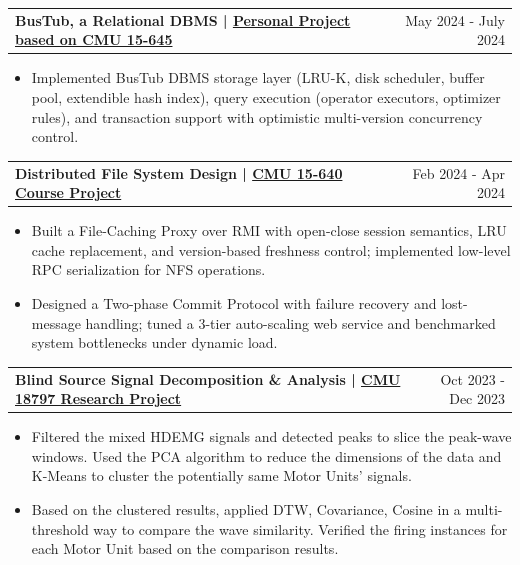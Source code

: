 \documentclass[a4paper,20pt]{article}
\makeatletter
\newcommand{\resumeProjectsSubHeading}[2]{
  \resumeProjectsSubHeadingItem{#1}{#2}
  \vspace{-10pt}
}
\newcommand{\resumeProjectsSubHeadingItem}[2]{
  \vspace{-1pt}
  \item{
    \begin{tabular*} {0.98\textwidth} {@{\hspace{-0.5em}}l@{\extracolsep{\fill}}r}
      \textbf{#1} & {#2} \\
    \end{tabular*}
  \vspace{-8pt}
  }
}
\newcommand{\resumeProjectsItemListStart}{
  \begin{itemize} [leftmargin=*]
}
\newcommand{\resumeProjectsItemListEnd}{
  \end{itemize}
  \vspace{0pt}
}
\newcommand{\resumeProjectsItem}[1]{
  \item{
    {#1} \vspace{-2pt}
  }
}
\makeatother
\begin{document}
\resumeProjectsSubHeading{{BusTub, a Relational DBMS} {| \href{https://github.com/Guo-lab/15645-Database}{Personal Project based on CMU 15-645 \faIcon{github}}}}{May 2024 - July 2024}
\resumeProjectsItemListStart
\resumeProjectsItem{Implemented BusTub DBMS storage layer (LRU-K, disk scheduler, buffer   
    pool, extendible hash index), query execution (operator executors,     
    optimizer rules), and transaction support with optimistic multi-version
     concurrency control. }
\resumeProjectsItemListEnd

\vspace{-3pt}

\resumeProjectsSubHeading{{Distributed File System Design} {| \href{https://github.com/Guo-lab/15640-Distributed-Systems}{CMU 15-640 Course Project \faIcon{github}}}}{Feb 2024 - Apr 2024}
\resumeProjectsItemListStart
\resumeProjectsItem{Built a File-Caching Proxy over RMI with open-close session semantics, LRU cache replacement, and version-based freshness control; implemented low-level RPC serialization for NFS operations.}
\resumeProjectsItem{Designed a Two-phase Commit Protocol with failure recovery and lost-message handling; tuned a 3-tier auto-scaling web service and benchmarked system bottlenecks under dynamic load.}
\resumeProjectsItemListEnd

\resumeProjectsSubHeading{Blind Source Signal Decomposition \& Analysis | \href{https://github.com/Guo-lab/MLSP-G2}{CMU 18797 Research Project \faIcon{github}}}{Oct 2023 - Dec 2023}
\resumeProjectsItemListStart
\resumeProjectsItem{Filtered the mixed HDEMG signals and detected peaks to slice the peak-wave windows. Used the PCA algorithm to reduce the dimensions of the data and K-Means to cluster the potentially same Motor Units' signals.}
\resumeProjectsItem{Based on the clustered results, applied DTW, Covariance, Cosine in a multi-threshold way to compare the wave similarity. Verified the firing instances for each Motor Unit based on the comparison results.}
\resumeProjectsItemListEnd
\end{document}
